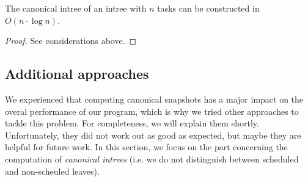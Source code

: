 \begin{theorem}
  The canonical intree of an intree with $n$ tasks can be constructed in $O(n\cdot \log n)$.
\end{theorem}

\begin{proof}
  See considerations above.
\end{proof}

\subsection{Additional approaches}
\label{sec:algorithm-canonical-snap-additional-approaches}

We experienced that computing canonical snapshots has a major impact on the overal performance of our program, which is why we tried other approaches to tackle this problem. For completeness, we will explain them shortly. Unfortunately, they did not work out as good as expected, but maybe they are helpful for future work. In this section, we focus on the part concerning the computation of \emph{canonical intrees} (i.e. we do not distinguish between scheduled and non-scheuled leaves).

